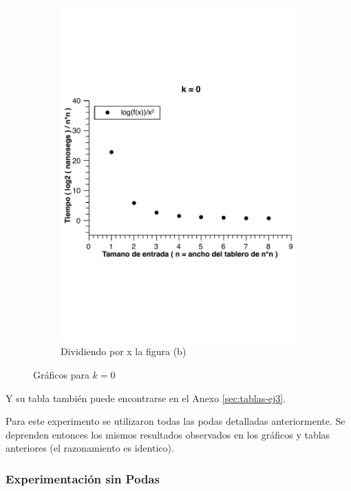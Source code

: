\begin{figure}[H]
        \begin{subfigure}[b]{0.5\textwidth}
                \includegraphics[width=\textwidth]{imagenes/grafico3-k-0-div-log.pdf}
                \caption{Dividiendo por x la figura (b)}
        \end{subfigure}
        \caption{Gráficos para $k=0$}
\end{figure}

Y su tabla también puede encontrarse en el Anexo \ref{sec:tablas-ej3}.

Para este experimento se utilizaron todas las podas detalladas anteriormente.
Se deprenden entonces los mismos resultados observados en los gráficos y tablas anteriores (el razonamiento es identico).

\subsubsection{Experimentación sin Podas}

